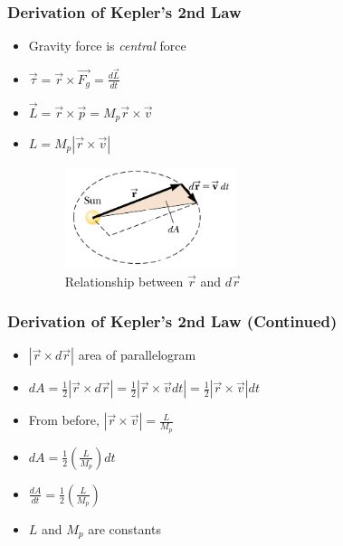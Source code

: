 \documentclass{beamer}
\begin{document}
\begin{frame}
\frametitle{Derivation of Kepler's 2nd Law}

\begin{itemize}

\item Gravity force is \textit{central} force

\item $
\vec{\tau} = \vec{r}\times\vec{F_g} = \frac{d\vec{L}}{dt}
$

\item $
 \vec{L} = \vec{r}\times \vec{p} = M_p \vec{r}\times\vec{v} 
 $

\item $
L = M_p \left|\vec{r} \times \vec{v}\right|
$

\begin{figure}[h] 
	\centering
		\includegraphics[width=5cm]{sun2.png}
	\caption{Relationship between  $\vec{r}$ and $d\vec{r}$}
	\label{fig:sun2}
\end{figure}





\end{itemize}


\end{frame}


\begin{frame}
\frametitle{Derivation of Kepler's 2nd Law (Continued)}

\begin{itemize}

\item $|\vec{r} \times d\vec{r}|$  area of parallelogram


\item $ dA = \frac{1}{2}|\vec{r} \times d\vec{r}| = \frac{1}{2}\left|\vec{r} \times \vec{v} dt \right| = \frac{1}{2}\left|\vec{r} \times \vec{v}\right| dt  $

\item From before, $\left|\vec{r} \times \vec{v}\right| = \frac{L}{M_p} $

\item $ dA = \frac{1}{2}\left(\frac{L}{M_p}\right)dt  $



\vspace{1cm}
\item $
\frac{dA}{dt} = \frac{1}{2}\left(\frac{L}{M_p}\right)
$

\item $L$ and $M_p$ are constants

\end{itemize}


\end{frame}
\end{document}

